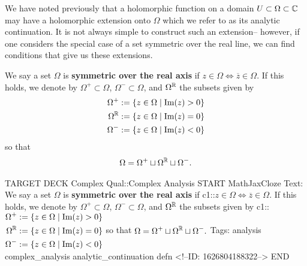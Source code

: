\documentclass{memoir}
\begin{document}


We have noted previously that a holomorphic function on a domain \(U\subset \Omega \subset \mathbb{C}\) may have a holomorphic extension onto \(\Omega \) which we refer to as its analytic continuation.
It is not always simple to construct such an extension-- however, if one considers the special case of a set symmetric over the real line, we can find conditions that give us these extensions.

\begin{defn}
	We say a set \(\Omega \) is \textbf{symmetric over the real axis} if \(z \in \Omega \iff \overline{z} \in \Omega \). If this holds, we denote by \(\Omega^{+}\subset \Omega \), \(\Omega^{-}\subset \Omega \), and \(\Omega^{\mathbb{R}}\) the subsets given by 
	\begin{align*}
		\Omega^{+} &:= \left\{z \in \Omega  \mid \textrm{Im}(z)>0 \right\} \\
		\Omega^{\mathbb{R}}&:= \left\{z \in \Omega  \mid \textrm{Im}(z)=0 \right\} \\
		\Omega^{-} &:= \left\{z \in \Omega  \mid \textrm{Im}(z)<0 \right\} 
	\end{align*}
	so that
	\begin{align*}
		\Omega = \Omega^{+} \sqcup \Omega^{\mathbb{R}} \sqcup \Omega^{-}.
	\end{align*}
\end{defn}

\begin{anki}
TARGET DECK
Complex Qual::Complex Analysis
START
MathJaxCloze
Text: We say a set \(\Omega \) is \textbf{symmetric over the real axis} if {{c1::\(z \in \Omega \iff \overline{z} \in \Omega \)}}. If this holds, we denote by \(\Omega^{+}\subset \Omega \), \(\Omega^{-}\subset \Omega \), and \(\Omega^{\mathbb{R}}\) the subsets given by 
{{c1::\(\begin{align*}
        	\Omega^{+} &:= \left\{z \in \Omega  \mid \textrm{Im}(z)>0 \right\} \\
        	\Omega^{\mathbb{R}}&:= \left\{z \in \Omega  \mid \textrm{Im}(z)=0 \right\} \\
        	\Omega^{-} &:= \left\{z \in \Omega  \mid \textrm{Im}(z)<0 \right\} 
        \end{align*}\)}}
	so that
\(\begin{align*}
	\Omega = \Omega^{+} \sqcup \Omega^{\mathbb{R}} \sqcup \Omega^{-}.
  \end{align*}\)
Tags: analysis complex_analysis analytic_continuation defn
<!--ID: 1626804188322-->
END
\end{anki}
\end{document}
